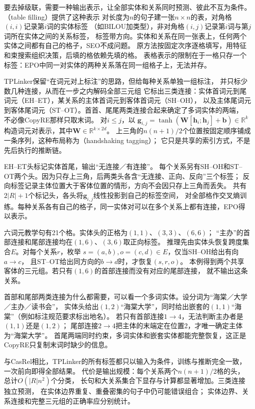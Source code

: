 要去掉级联，需要一种输出表示，让全部实体和关系同时预测、彼此不互为条件。
（table filling）提供了这种表示
对长度为$n$的句子建一张$n\times n$的表，对角格$(i,i)$记录第$i$词的实体标签
（如BILOU加类型），非对角格$(i,j)$记录第$i$词与第$j$词所在实体之间的关系标签，
标签带方向。实体和关系在同一张表上，任何两个实体之间都有自己的格子，SEO不成问题。
原方法按固定次序逐格填写，用特征和束搜索组织决策，后填的格依赖先填的格。
表格表示的限制在于一格只存一个标签：EPO中同一对实体的两种关系落在同一组格子上，无法并存。

TPLinker保留“在词元对上标注”的思路，但给每种关系单独一组标注，
并只标少数几种连接，从而在一步之内解码全部三元组
它标出三类连接：实体首词元到尾词元（EH--ET），某关系的主体首词元到客体首词元（SH--OH），
以及主体尾词元到客体尾词元（ST--OT）。首首、尾尾两类连接合起来确定了多词实体的两端，
不必像CopyRE那样只取末词。
对$i\leq j$，以
$\bm{g}_{i,j}=\tanh(\bm{W}[\bm{h}_i;\bm{h}_j]+\bm{b})\in\mathbb{R}^{k}$
构造词元对表示，其中$\bm{W}\in\mathbb{R}^{k\times2d}$。
上三角的$n(n+1)/2$个位置按固定顺序铺成一条序列，这种布局称为（handshaking tagging）；
它只是共享的索引方式，不是先后执行的推断链。

EH--ET头标记实体首尾，输出“无连接／有连接”。
每个关系另有SH--OH和ST--OT两个头。因为只存上三角，后两类头各含“无连接、正向、反向”三个标签；
反向标签记录主体位置大于客体位置的情形，方向不会因只存上三角而丢失。
共有$2|R|+1$个标记头，各头将$\bm{g}_{i,j}$线性投影到自己的标签空间，
对全部格作交叉熵训练。每种关系各有自己的格子，同一实体对可以在多个关系上都有连接，EPO得以表示。

六词元教学句有21个格。实体头的正格为$(1,1)$、$(3,3)$、$(6,6)$；
“主办”的首部连接和尾部连接均在$(1,6)$、$(3,6)$取正向标签。
推理先由实体头恢复跨度集合$E$。对每个关系$r$，枚举
$s=(a,b),o=(c,d)\in E$，仅当SH--OH给出有向$a\to c$，
且ST--OT给出同方向的$b\to d$时，才恢复$(s,r,o)$。
本例得到两个共享客体的三元组。若只有$(1,6)$的首部连接而没有对应的尾部连接，
就不输出这条关系。

首部和尾部两类连接为什么都需要，可以看一个多词实体。设分词为“海棠／大学／主办／读书会”，
实体头给出$(1,2)$“海棠大学”，同时给出嵌套的$(1,1)$“海棠”（例如标注规范要求标出地名）。
若只有首部连接$1\to4$，无法判断主办者是$(1,1)$还是$(1,2)$；
尾部连接$2\to4$把主体的末端定在位置2，才唯一确定主体为“海棠大学”。
首尾两端同时约束，多词实体和嵌套实体都能完整恢复，这正是CopyRE只复制末词时缺少的信息。

与CasRel相比，TPLinker的所有标签都只以输入为条件，训练与推断完全一致，一次前向即得全部结果。
代价是输出规模：每个关系两个$n(n+1)/2$格的头，总计$O(|R|n^2)$个分类，
长句和大关系集合下显存与计算都显著增加。三类连接独立预测，
在实体边界重复、重叠密集的句子中仍可能错误组合；
实体边界、关系连接和完整三元组的正确率应分别统计。

